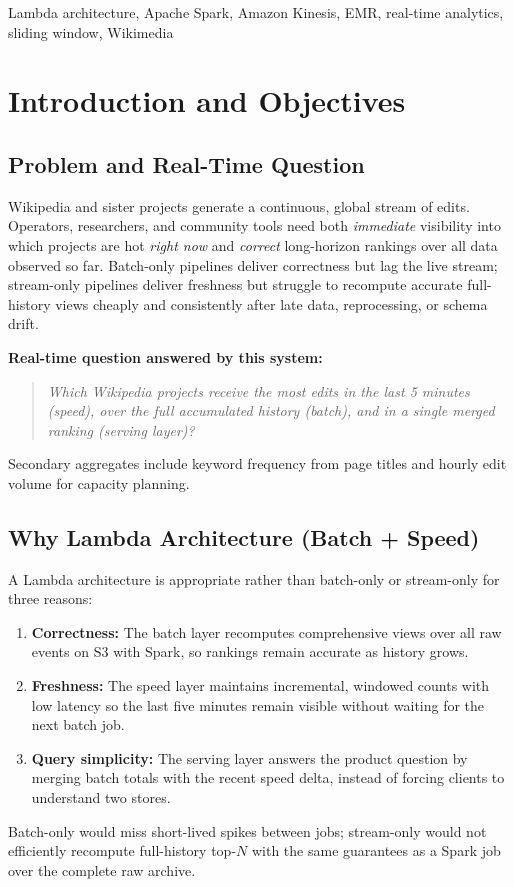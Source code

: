 \documentclass[conference]{IEEEtran}
\begin{document}
\begin{IEEEkeywords}
Lambda architecture, Apache Spark, Amazon Kinesis, EMR, real-time analytics, sliding window, Wikimedia
\end{IEEEkeywords}

\section{Introduction and Objectives}
\subsection{Problem and Real-Time Question}
Wikipedia and sister projects generate a continuous, global stream of edits. Operators, researchers, and community tools need both \emph{immediate} visibility into which projects are hot \emph{right now} and \emph{correct} long-horizon rankings over all data observed so far. Batch-only pipelines deliver correctness but lag the live stream; stream-only pipelines deliver freshness but struggle to recompute accurate full-history views cheaply and consistently after late data, reprocessing, or schema drift.

\textbf{Real-time question answered by this system:}
\begin{quote}
\textit{Which Wikipedia projects receive the most edits in the last 5 minutes (speed), over the full accumulated history (batch), and in a single merged ranking (serving layer)?}
\end{quote}
Secondary aggregates include keyword frequency from page titles and hourly edit volume for capacity planning.

\subsection{Why Lambda Architecture (Batch + Speed)}
A Lambda architecture is appropriate rather than batch-only or stream-only for three reasons:
\begin{enumerate}
\item \textbf{Correctness:} The batch layer recomputes comprehensive views over all raw events on S3 with Spark, so rankings remain accurate as history grows.
\item \textbf{Freshness:} The speed layer maintains incremental, windowed counts with low latency so the last five minutes remain visible without waiting for the next batch job.
\item \textbf{Query simplicity:} The serving layer answers the product question by merging batch totals with the recent speed delta, instead of forcing clients to understand two stores.
\end{enumerate}
Batch-only would miss short-lived spikes between jobs; stream-only would not efficiently recompute full-history top-$N$ with the same guarantees as a Spark job over the complete raw archive.
\end{document}
